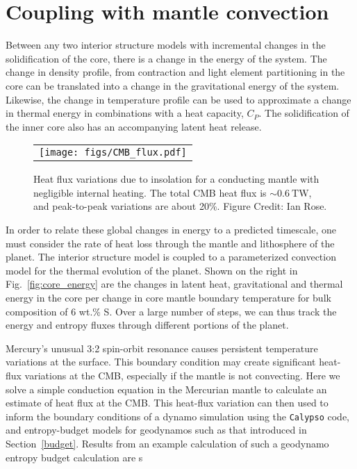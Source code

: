 \section{Coupling with mantle convection}


Between any two interior structure models with incremental changes in the
solidification of the core, there is a change in the energy of the system. The change
in density profile, from contraction and light element partitioning in the core can
be translated into a change in the gravitational energy of the system. Likewise, the
change in temperature profile can be used to approximate a change in thermal energy
in combinations with a heat capacity, $C_P$. The solidification of the inner core
also has an accompanying latent heat release.  \begin{figure}[h] %
   \centering
\begin{tabular}{c}
 \texttt{[image: figs/CMB\_flux.pdf]} 
\end{tabular}
\caption{ Heat flux variations due to insolation for a conducting mantle with
    negligible internal heating. The total CMB heat flux is $\sim 0.6~\mathrm{TW}$,
and peak-to-peak variations are about 20\%. Figure Credit: Ian Rose.}
\label{fig:flux}
\end{figure}

In order to relate these global changes in energy to a predicted timescale, one must
consider the rate of heat loss through the mantle and lithosphere of the planet.  The
interior structure model is coupled to a parameterized convection model
\citep{Stevenson1983} for the thermal evolution of the planet. Shown on the right in
Fig.~\ref{fig:core_energy} are the changes in latent heat, gravitational and thermal
energy in the core per change in core mantle boundary temperature for bulk
composition of 6 wt.\% S. Over a large number of steps, we can thus track the energy
and entropy fluxes through different portions of the planet.

Mercury's unusual 3:2 spin-orbit resonance causes persistent temperature variations
at the surface.  This boundary condition may create significant heat-flux variations
at the CMB, especially if the mantle is not convecting.  Here we solve a simple
conduction equation in the Mercurian mantle to calculate an estimate of heat flux at
the CMB.  This heat-flux variation can then used to inform the boundary conditions of
a dynamo simulation using the \texttt{Calypso} code, and entropy-budget models for
geodynamos such as that introduced in Section~\ref{budget}. Results from an example
calculation of such a geodynamo entropy budget calculation are s



